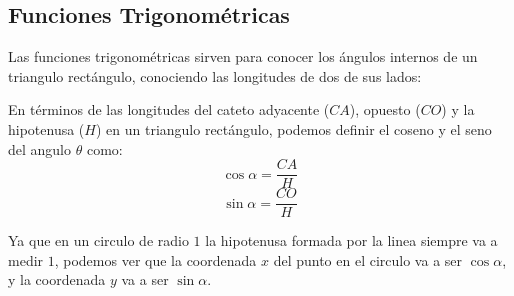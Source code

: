 \documentclass[../teoria.root.tex]{subfiles}
\begin{document}
\subsection{Funciones Trigonométricas}

Las funciones trigonométricas sirven para conocer los ángulos internos de un
triangulo rectángulo, conociendo las longitudes de dos de sus lados:

\begin{center}
\end{center}

En términos de las longitudes del cateto adyacente ($CA$), opuesto ($CO$) y la
hipotenusa ($H$) en un triangulo rectángulo, podemos definir el coseno y el
seno del angulo $\theta$ como:
\[\cos\alpha=\frac{CA}{H}\]
\[\sin\alpha=\frac{CO}{H}\]

Ya que en un circulo de radio $1$ la hipotenusa formada por la linea siempre va
a medir $1$, podemos ver que la coordenada $x$ del punto en el circulo va a ser
$\cos\alpha$, y la coordenada $y$ va a ser $\sin\alpha$.
\end{document}
